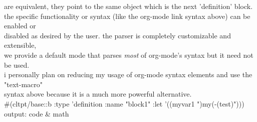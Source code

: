 \documentclass[11pt]{article}
\begin{document}
are equivalent, they point to the same object which is the next 'definition' block.\\the specific functionality or syntax (like the org-mode link syntax above) can be enabled or\\disabled as desired by the user. the parser is completely customizable and extensible,\\we provide a default mode that parses \textit{most} of org-mode's syntax but it need not be used.\\i personally plan on reducing my usage of org-mode syntax elements and use the "text-macro"\\syntax above because it is a much more powerful alternative.\\\#(cltpt/base::b :type 'definition :name "block1" :let '((myvar1 ")my(-(test)")))\\output: %
 code                             & math                  
\end{document}

